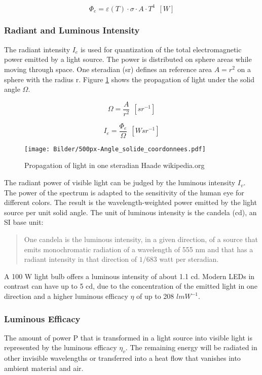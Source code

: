 \begin{equation}
\Phi_e = \varepsilon(T)\cdot \sigma \cdot A \cdot T^4  ~~ [W]
\end{equation} 


\subsubsection{Radiant and Luminous Intensity}
 The radiant intensity $I_e$ is used for quantization of the total electromagnetic power emitted by a light source. The power is distributed on sphere areas while moving through space. One steradian (sr) defines an reference area $A=r^2$ on a sphere with the radius r. Figure \ref{fig:steradian} shows the propagation of light under the solid angle $\Omega$.

\begin{equation}
\Omega =\frac {A}{r^2}~~[sr^{-1}]
\label{eq:solid_angles}
\end{equation}

\begin{equation}
I_e=\frac {\Phi_e} {\Omega} ~~ [W sr^{-1}]
\end{equation}
\medskip
\begin{figure}[!h]
	\centering
	\texttt{[image: Bilder/500px-Angle\_solide\_coordonnees.pdf]}
	\caption{Propagation of light in one steradian \tiny Haade wikipedia.org \ccbysa}
	\label{fig:steradian}
\end{figure} 


The radiant power of visible light can be judged by the luminous intensity $I_v$. The power of the spectrum is adapted to the sensitivity of the human eye for different colors. The result is the wavelength-weighted power emitted by the light source per unit solid angle. The unit of luminous intensity is the candela (cd), an SI base unit:

\begin{quote}
	One candela is the luminous intensity, in a given direction, of a source that emits monochromatic radiation of a wavelength of 555 nm and that has a radiant intensity in that direction of $1/683$ watt per steradian\cite{taylor1999nist}.
\end{quote}

A 100 W light bulb offers a luminous intensity of about 1.1 cd. Modern LEDs in contrast can have up to 5 cd, due to the concentration of the emitted light in one direction and a higher luminous efficacy $\eta$ of up to 208 $lm W^{-1}$.

\subsubsection{Luminous Efficacy}
The amount of power P that is transformed in a light source into visible light is represented by the luminous efficacy $\eta_v$. The remaining energy will be radiated in other invisible wavelengths or transferred into a heat flow that vanishes into ambient material and air. 


